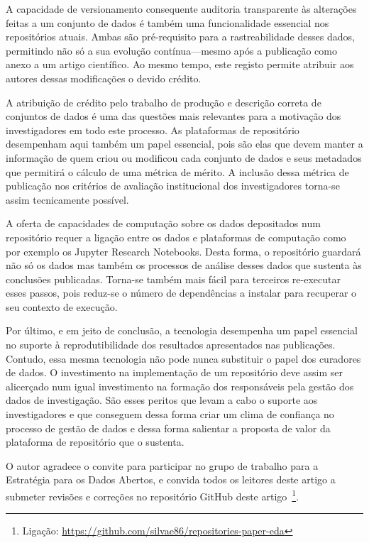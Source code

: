 \documentclass[sigconf,nonacm]{acmart}
\begin{document}
A capacidade de versionamento consequente auditoria transparente às alterações feitas a um conjunto de dados é também uma funcionalidade essencial nos repositórios atuais. Ambas são pré-requisito para a rastreabilidade desses dados, permitindo não só a sua evolução contínua---mesmo após a publicação como anexo a um artigo científico. Ao mesmo tempo, este registo permite atribuir aos autores dessas modificações o devido crédito.

A atribuição de crédito pelo trabalho de produção e descrição correta de conjuntos de dados é uma das questões mais relevantes para a motivação dos investigadores em todo este processo. As plataformas de repositório desempenham aqui também um papel essencial, pois são elas que devem manter a informação de quem criou ou modificou cada conjunto de dados e seus metadados que permitirá o cálculo de uma métrica de mérito. A inclusão dessa métrica de publicação nos critérios de avaliação institucional dos investigadores torna-se assim tecnicamente possível.

A oferta de capacidades de computação sobre os dados depositados num repositório requer a ligação entre os dados e plataformas de computação como por exemplo os Jupyter Research Notebooks. Desta forma, o repositório guardará não só os dados mas também os processos de análise desses dados que sustenta às conclusões publicadas. Torna-se também mais fácil para terceiros re-executar esses passos, pois reduz-se o número de dependências a instalar para recuperar o seu contexto de execução.

Por último, e em jeito de conclusão, a tecnologia desempenha um papel essencial no suporte à reprodutibilidade dos resultados apresentados nas publicações. Contudo, essa mesma tecnologia não pode nunca substituir o papel dos curadores de dados. O investimento na implementação de um repositório deve assim ser alicerçado num igual investimento na formação dos responsáveis pela gestão dos dados de investigação. São esses peritos que levam a cabo o suporte aos investigadores e que conseguem dessa forma criar um clima de confiança no processo de gestão de dados e dessa forma salientar a proposta de valor da plataforma de repositório que o sustenta.


\begin{acks}
O autor agradece o convite para participar no grupo de trabalho para a Estratégia para os Dados Abertos, e convida todos os leitores deste artigo a submeter revisões e correções no repositório GitHub deste artigo~\footnote{Ligação: \url{https://github.com/silvae86/repositories-paper-eda}}.
\end{acks}




\end{document}
